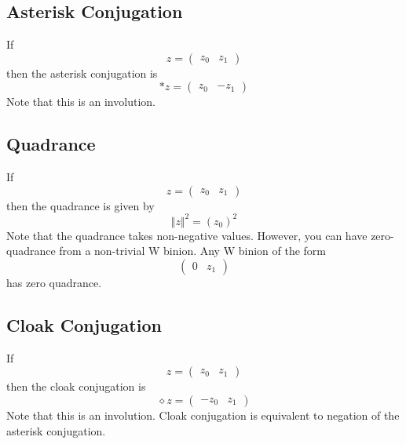\subsection{Asterisk Conjugation}
If
\begin{equation}
    z = \begin{pmatrix}
        z_{0} & z_{1}
    \end{pmatrix}
\end{equation}
then the asterisk conjugation is
\begin{equation}
    {\ast z} = \begin{pmatrix}
        z_{0} & -z_{1}
    \end{pmatrix}
\end{equation}
Note that this is an involution.
\subsection{Quadrance}
If
\begin{equation}
    z = \begin{pmatrix}
        z_{0} & z_{1}
    \end{pmatrix}
\end{equation}
then the quadrance is given by
\begin{equation}
    \Vert z \Vert^{2} = (z_{0})^{2}
\end{equation}
Note that the quadrance takes non-negative values. However, you can have zero-quadrance from a non-trivial W binion. Any W binion of the form
\begin{equation}
    \begin{pmatrix}
        0 & z_{1}
    \end{pmatrix}
\end{equation}
has zero quadrance.
\subsection{Cloak Conjugation}
If
\begin{equation}
    z = \begin{pmatrix}
        z_{0} & z_{1}
    \end{pmatrix}
\end{equation}
then the cloak conjugation is
\begin{equation}
    {\diamond z} = \begin{pmatrix}
        -z_{0} & z_{1}
    \end{pmatrix}
\end{equation}
Note that this is an involution. Cloak conjugation is equivalent to negation of the asterisk conjugation.
